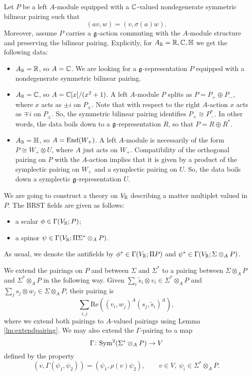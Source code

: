 \documentclass[10pt, oneside]{article}
\renewcommand{\Re}{\mathrm{Re}}
\begin{document}
Let $P$ be a left $A$-module equipped with a $\mathbb C$-valued nondegenerate symmetric bilinear pairing such that
\[(av, w) = (v, \sigma(a)w).\]
Moreover, assume $P$ carries a $\mathfrak g$-action commuting with the $A$-module structure and preserving the bilinear pairing. Explicitly, for $A_\mathbb R=\mathbb R, \mathbb C, \mathbb{H}$ we get the following data:
\begin{itemize}
\item $A_\mathbb R=\mathbb R$, so $A=\mathbb C$. We are looking for a $\mathfrak g$-representation $P$ equipped with a nondegenerate symmetric bilinear pairing.

\item $A_\mathbb R=\mathbb C$, so $A=\mathbb C[x]/(x^2+1)$. A left $A$-module $P$ splits as $P=P_+\oplus P_-$, where $x$ acts as $\pm i$ on $P_{\pm}$. Note that with respect to the right $A$-action $x$ acts as $\mp i$ on $P_{\pm}$. So, the symmetric bilinear pairing identifies $P_+\cong P_-^*$. In other words, the data boils down to a $\mathfrak g$-representation $R$, so that $P = R\oplus R^*$.

\item $A_\mathbb R=\mathbb{H}$, so $A=\operatorname{End}(W_+)$. A left $A$-module is necessarily of the form $P\cong W_+\otimes U$, where $A$ just acts on $W_+$. Compatibility of the orthogonal pairing on $P$ with the $A$-action implies that it is given by a product of the symplectic pairing on $W_+$ and a symplectic pairing on $U$. So, the data boils down a symplectic $\mathfrak g$-representation $U$.
\end{itemize}

We are going to construct a theory on $V_\mathbb R$ describing a matter multiplet valued in $P$. The BRST fields are given as follows:
\begin{itemize}
\item a scalar $\phi\in\Gamma(V_\mathbb R; P)$;
\item a spinor $\psi\in\Gamma(V_\mathbb R; \Pi \Sigma^*\otimes_A P)$.
\end{itemize}
As usual, we denote the antifields by $\phi^*\in\Gamma(V_\mathbb R; \Pi P)$ and $\psi^*\in\Gamma(V_\mathbb R; \Sigma\otimes_A P)$.

We extend the pairings on $P$ and between $\Sigma$ and $\Sigma^*$ to a pairing between $\Sigma\otimes_A P$ and $\Sigma^*\otimes_A P$ in the following way. Given $\sum_i \tilde{s}_i\otimes v_i\in \Sigma^*\otimes_A P$ and $\sum_j s_j\otimes w_j\in\Sigma\otimes_A P$, their pairing is
\begin{equation}
\sum_{i, j} \Re((v_i, w_j)^A (s_j, \tilde{s}_i)^A),
\label{eq:spinorialmatterpairing}
\end{equation}
where we extend both pairings to $A$-valued pairings using Lemma \ref{lm:extendpairing}. We may also extend the $\Gamma$-pairing to a map
\[\Gamma\colon {\rm Sym}^2(\Sigma^*\otimes_A P)\rightarrow V\]
defined by the property
\[(v, \Gamma(\psi_1, \psi_2)) = (\psi_1, \rho(v) \psi_2),\qquad v\in V,\ \psi_i\in \Sigma^*\otimes_A P.\]
\end{document}
